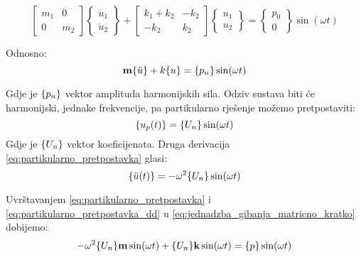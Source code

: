 \begin{equation}\label{eq:jednadzba_gibanja_matricno}
    \begin{bmatrix}
        m_1 & 0 \\
        0   & m_2
    \end{bmatrix}
    \begin{Bmatrix}
        \ddot{u}_1\\
        \ddot{u}_2
    \end{Bmatrix}
    +
    \begin{bmatrix}
        k_1+k_2 & -k_2\\
        -k_2 & k_2
    \end{bmatrix}
    \begin{Bmatrix}
        u_1\\
        u_2
    \end{Bmatrix}
    =
    \begin{Bmatrix}
        p_0\\
        0 
    \end{Bmatrix}
    \sin(\omega t)
\end{equation}

Odnosno:
\begin{equation}\label{eq:jednadzba_gibanja_matricno_kratko}
    \mm\vtor{u}{:}+k\vtor{u}{}=\vtor{p_n}{}\sin(\omega t)
\end{equation}

Gdje je $\vtor{p_n}{}$ vektor amplituda harmonijskih sila. Odziv sustava biti će
harmonijski, jednake frekvencije, pa partikularno rješenje možemo pretpostaviti:
\begin{equation}\label{eq:partikularno_pretpostavka}
    \vtor{u_p(t)}{}=\vtor{U_n}{}\sin(\omega t)
\end{equation}
Gdje je $\vtor{U_n}{}$ vektor koeficijenata.
Druga derivacija \eqref{eq:partikularno_pretpostavka} glasi:
\begin{equation}\label{eq:partikularno_pretpostavka_dd}
    \{\ddot{u}(t)\}=-\omega^2\vtor{U_n}{}\sin(\omega t)
\end{equation}

Uvrštavanjem \eqref{eq:partikularno_pretpostavka} i \eqref{eq:partikularno_pretpostavka_dd}
u \eqref{eq:jednadzba_gibanja_matricno_kratko} dobijemo:
\begin{equation}\label{eq:neodredjeni_koeficijenti_1}
    -\omega^2\vtor{U_n}{}\mm\sin(\omega t) 
    +
    \vtor{U_n}{}\kk\sin(\omega t)
    =
    \vtor{p}{}\sin(\omega t)
\end{equation}

